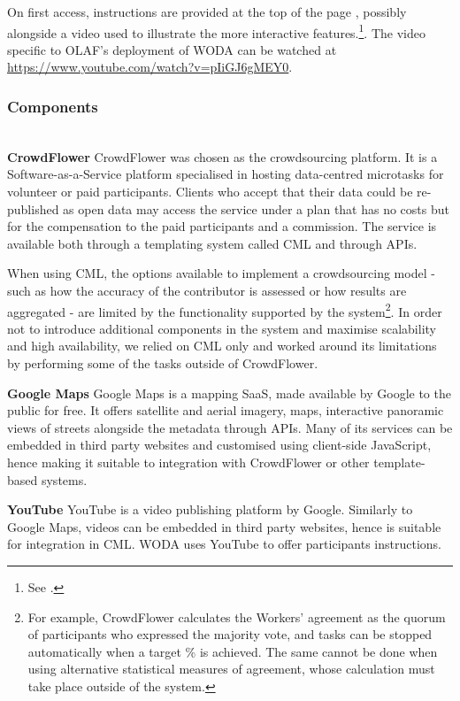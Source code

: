 On first access, instructions are provided at the top of the page , possibly alongside a video used to illustrate the more interactive features.\footnote{See \screenshotwithvideourl.}. The video specific to OLAF's deployment of WODA can be watched at \url{https://www.youtube.com/watch?v=pIiGJ6gMEY0}.

\subsubsection{Components} \leavevmode \\ %

\textbf{CrowdFlower} CrowdFlower was chosen as the crowdsourcing platform. It is a Software-as-a-Service platform specialised in hosting data-centred microtasks for volunteer or paid participants. Clients who accept that their data could be re-published as open data may access the service under a plan that has no costs but for the compensation to the paid participants and a commission. The service is available both through a templating system called CML and through APIs. 

When using CML, the options available to implement a crowdsourcing model - such as how the accuracy of the contributor is assessed or how results are aggregated - are limited by the functionality supported by the system\footnote{For example, CrowdFlower calculates the Workers' agreement as the quorum of participants who expressed the majority vote, and tasks can be stopped automatically when a target \% is achieved. The same cannot be done when using alternative statistical measures of agreement, whose calculation must take place outside of the system.}. In order not to introduce additional components in the system and maximise scalability and high availability, we relied on CML only and worked around its limitations by performing some of the tasks outside of CrowdFlower. 

\textbf{Google Maps} Google Maps is a mapping SaaS, made available by Google to the public for free. It offers satellite and aerial imagery, maps, interactive panoramic views of streets alongside the metadata through APIs. Many of its services can be embedded in third party websites and customised using client-side JavaScript, hence making it suitable to integration with CrowdFlower or other template-based systems. 

\textbf{YouTube} YouTube is a video publishing platform by Google. Similarly to Google Maps, videos can be embedded in third party websites, hence is suitable for integration in CML. WODA uses YouTube to offer participants instructions.  


